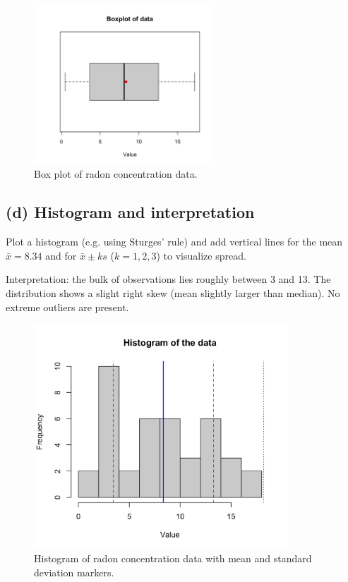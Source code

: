 \documentclass[12pt]{article}
\begin{document}
\begin{figure}[H]
\centering
\includegraphics[width=0.6\textwidth]{1.5.10_c.png}
\caption{Box plot of radon concentration data.}
\end{figure}

\subsection*{(d) Histogram and interpretation}
Plot a histogram (e.g. using Sturges' rule) and add vertical lines for the mean $\bar{x}=8.34$ and for $\bar{x}\pm k s$ ($k=1,2,3$) to visualize spread.

Interpretation: the bulk of observations lies roughly between 3 and 13. The distribution shows a slight right skew (mean slightly larger than median). No extreme outliers are present.

\begin{figure}[H]
\centering
\includegraphics[width=0.85\textwidth]{1.5.10_d.png}
\caption{Histogram of radon concentration data with mean and standard deviation markers.}
\end{figure}
\end{document}
